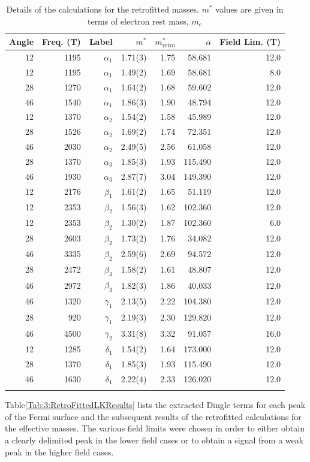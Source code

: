 \begin{table}
    \begin{center}
        \caption{Details of the calculations for the retrofitted masses. $m^*$ values are given in terms of electron rest mass, $m_e$}
        \begin{tabular}[!h]{rrrrrrr}
\toprule
Angle	& Freq. (\unit[]{T})	& Label & $m^*$ & $m^*_{\textrm{retro}}$	& $\alpha$	& Field Lim. (\unit[]{T}) \\
\midrule
12	 & 1195	 & $\alpha_1$	 & 1.71(3)	& 1.75	& 58.681	& 12.0\\
12	 & 1195	 & $\alpha_1$	 & 1.49(2)	& 1.69	& 58.681	& 8.0\\
28	 & 1270	 & $\alpha_1$	 & 1.64(2)	& 1.68	& 59.602	& 12.0\\
46	 & 1540	 & $\alpha_1$	 & 1.86(3)	& 1.90	& 48.794	& 12.0\\
12	 & 1370	 & $\alpha_2$	 & 1.54(2)	& 1.58	& 45.989	& 12.0\\
28	 & 1526	 & $\alpha_2$	 & 1.69(2)	& 1.74	& 72.351	& 12.0\\
46	 & 2030	 & $\alpha_2$	 & 2.49(5)	& 2.56	& 61.058	& 12.0\\
28	 & 1370	 & $\alpha_3$	 & 1.85(3)	& 1.93	& 115.490	& 12.0\\
46	 & 1930	 & $\alpha_3$	 & 2.87(7)	& 3.04	& 149.390	& 12.0\\
12	 & 2176	 & $\beta_1$	 & 1.61(2)	& 1.65	& 51.119	& 12.0\\
12	 & 2353	 & $\beta_2$	 & 1.56(3)	& 1.62	& 102.360	& 12.0\\
12	 & 2353	 & $\beta_2$	 & 1.30(2)	& 1.87	& 102.360	& 6.0\\
28	 & 2603	 & $\beta_2$	 & 1.73(2)	& 1.76	& 34.082	& 12.0\\
46	 & 3335	 & $\beta_2$	 & 2.59(6)	& 2.69	& 94.572	& 12.0\\
28	 & 2472	 & $\beta_3$	 & 1.58(2)	& 1.61	& 48.807	& 12.0\\
46	 & 2972	 & $\beta_3$	 & 1.82(3)	& 1.86	& 40.033	& 12.0\\
46	 & 1320	 & $\gamma_1$	 & 2.13(5)	& 2.22	& 104.380	& 12.0\\
28	 & 920	 & $\gamma_1$	 & 2.19(3)	& 2.30	& 129.820	& 12.0\\
46	 & 4500	 & $\gamma_2$	 & 3.31(8)	& 3.32	& 91.057	& 16.0\\
12	 & 1285	 & $\delta_1$	 & 1.54(2)	& 1.64	& 173.000	& 12.0\\
28	 & 1370	 & $\delta_1$	 & 1.85(3)	& 1.93	& 115.490	& 12.0\\
46	 & 1630	 & $\delta_1$	 & 2.22(4)	& 2.33	& 126.020	& 12.0\\
\bottomrule
        \label{Table:3:RetroFittedLKResults}
        \end{tabular}
    \end{center}
\end{table}
Table\ref{Tab:3:RetroFittedLKResults} lists the extracted Dingle terms for each peak of the Fermi surface and the subsequent results of the retrofitted calculations for the effective masses. The various field limits were chosen in order to either obtain a clearly delimited peak in the lower field cases or to obtain a signal from a weak peak in the higher field cases.



